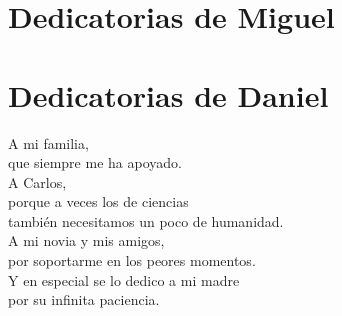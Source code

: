 \chapter*{Dedicatorias de Miguel}

\chapter*{Dedicatorias de Daniel}
\begin{center}
A mi familia,\\
que siempre me ha apoyado.\\

A Carlos,\\
porque a veces los de ciencias \\
también necesitamos un poco de humanidad.\\

A mi novia y mis amigos, \\
por soportarme en los peores momentos.\\

Y en especial se lo dedico a mi madre\\
por su infinita paciencia. \\
\end{center}

